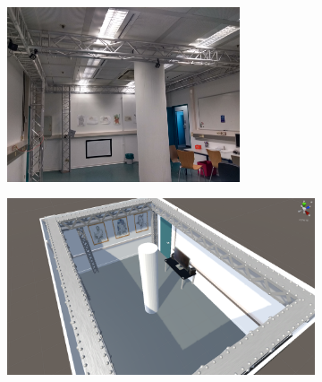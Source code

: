\begin{figure}
    \begin{subfigure}{0.49\textwidth}
        \centering
        \includegraphics[width=0.755\textwidth]{figures/photo_lab}
        \caption{}
        \label{sfig:lab_photo}
    \end{subfigure}
    \hfill
    \begin{subfigure}{0.49\textwidth}
        \includegraphics[width=\textwidth]{figures/lab3}
        \caption{}
        \label{sfig:lab_screenshot_1}
    \end{subfigure}


\end{figure}
